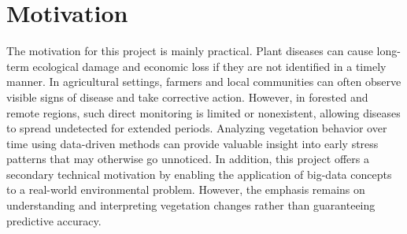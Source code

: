 \section{Motivation}
The motivation for this project is mainly practical. Plant diseases can cause long-term ecological damage and economic loss if they are not identified in a timely manner. In agricultural settings, farmers and local communities can often observe visible signs of disease and take corrective action. However, in forested and remote regions, such direct monitoring is limited or nonexistent, allowing diseases to spread undetected for extended periods. Analyzing vegetation behavior over time using data-driven methods can provide valuable insight into early stress patterns that may otherwise go unnoticed. In addition, this project offers a secondary technical motivation by enabling the application of big-data concepts to a real-world environmental problem. However, the emphasis remains on understanding and interpreting vegetation changes rather than guaranteeing predictive accuracy.